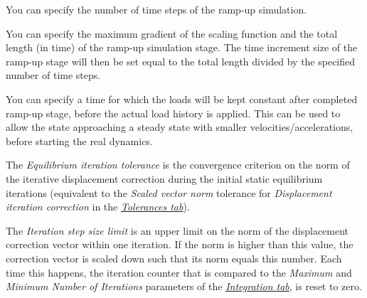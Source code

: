 {%

\begin{bulletlist}
  \setcounter{enumi}{4}
\item
  You can specify the number of time steps of the ramp-up simulation.
\item
  You can specify the maximum gradient of the scaling function and the
  total length (in time) of the ramp-up simulation stage. The time
  increment size of the ramp-up stage will then be set equal to the
  total length divided by the specified number of time steps.
\item
  You can specify a time for which the loads will be kept constant after
  completed ramp-up stage, before the actual load history is applied.
  This can be used to allow the state approaching a steady state with
  smaller velocities/accelerations, before starting the real dynamics.
\end{bulletlist}

\clearpage
The {\sl Equilibrium iteration tolerance} is the convergence criterion on the
norm of the iterative displacement correction during the initial static
equilibrium iterations (equivalent to the {\sl Scaled vector norm} tolerance
for {\sl Displacement iteration correction} in the
\protect\hyperlink{tolerances-tab}{\sl Tolerances tab}).

The {\sl Iteration step size limit} is an upper limit on the norm of the
displacement correction vector within one iteration. If the norm is higher than
this value, the correction vector is scaled down such that its norm equals this
number. Each time this happens, the iteration counter that is compared to the
{\sl Maximum} and {\sl Minimum Number of Iterations} parameters of the
\protect\hyperlink{integration-tab}{\sl Integration tab}, is reset to zero.



}
